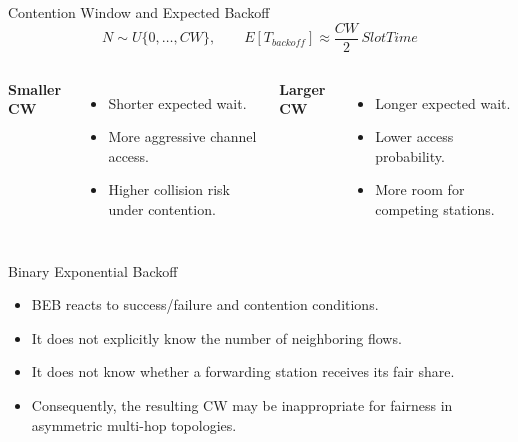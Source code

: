 \begin{frame}[shrink=5]{Contention Window and Expected Backoff}
\[
N\sim U\{0,\ldots,CW\},\qquad
E[T_{backoff}]\approx \frac{CW}{2}\,SlotTime
\]
\begin{columns}[T,onlytextwidth]
\textbf{Smaller CW}
\begin{itemize}
\item Shorter expected wait.
\item More aggressive channel access.
\item Higher collision risk under contention.
\end{itemize}
\textbf{Larger CW}
\begin{itemize}
\item Longer expected wait.
\item Lower access probability.
\item More room for competing stations.
\end{itemize}
\end{columns}
\vspace{0.25cm}
\end{frame}

\begin{frame}{Binary Exponential Backoff}
\begin{center}
\end{center}
\vspace{0.35cm}
\begin{itemize}
\item BEB reacts to success/failure and contention conditions.
\item It does not explicitly know the number of neighboring flows.
\item It does not know whether a forwarding station receives its fair share.
\item Consequently, the resulting CW may be inappropriate for fairness in asymmetric multi-hop topologies.
\end{itemize}
\end{frame}

